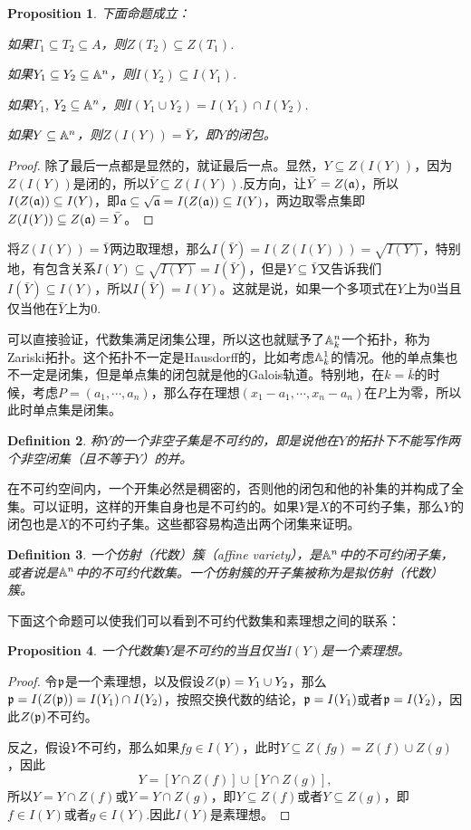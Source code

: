 \documentclass[9pt]{extarticle}
\theoremstyle{plain}%
\newtheorem{defi}{Definition}[section]%
\newtheorem{pro}[defi]{Proposition}%
\begin{document}
\begin{pro}
下面命题成立：

 如果$T_1\subseteq T_2 \subseteq A$，则$Z(T_2)\subseteq Z(T_1)$.

 如果$Y_1\subseteq Y_2 \subseteq \mathbb{A}^n$，则$I(Y_2)\subseteq I(Y_1)$.

 如果$Y_1$, $Y_2 \subseteq \mathbb{A}^n$，则$I(Y_1\cup Y_2)=I(Y_1)\cap I(Y_2)$.

 如果$Y \subseteq \mathbb{A}^n$，则$Z(I(Y))=\bar{Y}$，即$Y$的闭包。
\end{pro}
\begin{proof}
除了最后一点都是显然的，就证最后一点。显然，$Y\subseteq Z(I(Y))$，因为$Z(I(Y))$是闭的，所以$\bar{Y}\subseteq Z(I(Y))$.反方向，让$\bar{Y}=Z(\mathfrak{a})$，所以$I(Z(\mathfrak{a}))\subseteq I(Y)$，即$\mathfrak{a}\subseteq \sqrt{\mathfrak{a}}=I(Z(\mathfrak{a}))\subseteq I(Y)$，两边取零点集即$Z(I(Y))\subseteq Z(\mathfrak{a})=\bar{Y}$。
\end{proof}
将$Z(I(Y))=\bar{Y}$两边取理想，那么$I(\bar{Y})=I(Z(I(Y)))=\sqrt{I(Y)}$，特别地，有包含关系$I(Y)\subseteq\sqrt{I(Y)}=I(\bar{Y})$，但是$Y\subseteq \bar{Y}$又告诉我们$I(\bar{Y})\subseteq I(Y)$，所以$I(\bar{Y})=I(Y)$。这就是说，如果一个多项式在$Y$上为$0$当且仅当他在$\bar{Y}$上为$0$.

可以直接验证，代数集满足闭集公理，所以这也就赋予了$\mathbb{A}^n_k$一个拓扑，称为Zariski拓扑。这个拓扑不一定是Hausdorff的，比如考虑$\mathbb{A}^1_k$的情况。他的单点集也不一定是闭集，但是单点集的闭包就是他的Galois轨道。特别地，在$k=\bar{k}$的时候，考虑$P=(a_1,\cdots ,a_n)$，那么存在理想$(x_1-a_1,\cdots,x_n-a_n)$在$P$上为零，所以此时单点集是闭集。

\begin{defi}
称$Y$的一个非空子集是不可约的，即是说他在$Y$的拓扑下不能写作两个非空闭集（且不等于$Y$）的并。
\end{defi}
在不可约空间内，一个开集必然是稠密的，否则他的闭包和他的补集的并构成了全集。可以证明，这样的开集自身也是不可约的。如果$Y$是$X$的不可约子集，那么$Y$的闭包也是$X$的不可约子集。这些都容易构造出两个闭集来证明。
 
\begin{defi}
一个仿射（代数）簇（affine variety），是$\mathbb{A}^n$中的不可约闭子集，或者说是$\mathbb{A}^n$中的不可约代数集。一个仿射簇的开子集被称为是拟仿射（代数）簇。
\end{defi}

下面这个命题可以使我们可以看到不可约代数集和素理想之间的联系：

\begin{pro}
一个代数集$Y$是不可约的当且仅当$I(Y)$是一个素理想。
\label{p1.2}
\end{pro}
\begin{proof}
令$\mathfrak{p}$是一个素理想，以及假设$Z(\mathfrak{p})=Y_1\cup Y_2$，那么$\mathfrak{p}=I(Z(\mathfrak{p}))=I(Y_1)\cap I(Y_2)$，按照交换代数的结论，$\mathfrak{p}=I(Y_1)$或者$\mathfrak{p}=I(Y_2)$，因此$Z(\mathfrak{p})$不可约。

反之，假设$Y$不可约，那么如果$fg\in I(Y)$，此时$Y\subseteq Z(fg)=Z(f)\cup Z(g)$，因此
\[
	Y=[Y\cap Z(f)]\cup [Y\cap Z(g)],
\]
所以$Y=Y\cap Z(f)$或$Y=Y\cap Z(g)$，即$Y\subseteq Z(f)$或者$Y\subseteq Z(g)$，即$f\in I(Y)$或者$g\in I(Y)$.因此$I(Y)$是素理想。
\end{proof}
\end{document}
